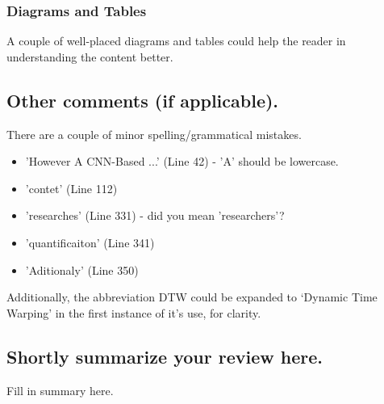 \documentclass[12pt]{article}
\begin{document}
\subsubsection*{Diagrams and Tables}
A couple of well-placed diagrams and tables could help the reader in understanding the content better.

\subsection*{Other comments (if applicable).}
There are a couple of minor spelling/grammatical mistakes.
\begin{itemize}
    \item 'However A CNN-Based ...' (Line 42) - 'A' should be lowercase.
    \item 'contet' (Line 112) 
    \item 'researches' (Line 331) - did you mean 'researchers'?
    \item 'quantificaiton' (Line 341)
    \item 'Aditionaly' (Line 350)
\end{itemize}

Additionally, the abbreviation DTW could be expanded to `Dynamic Time Warping' in the first instance of it's use, for clarity.

\subsection*{Shortly summarize your review here.}
Fill in summary here.
\end{document}
